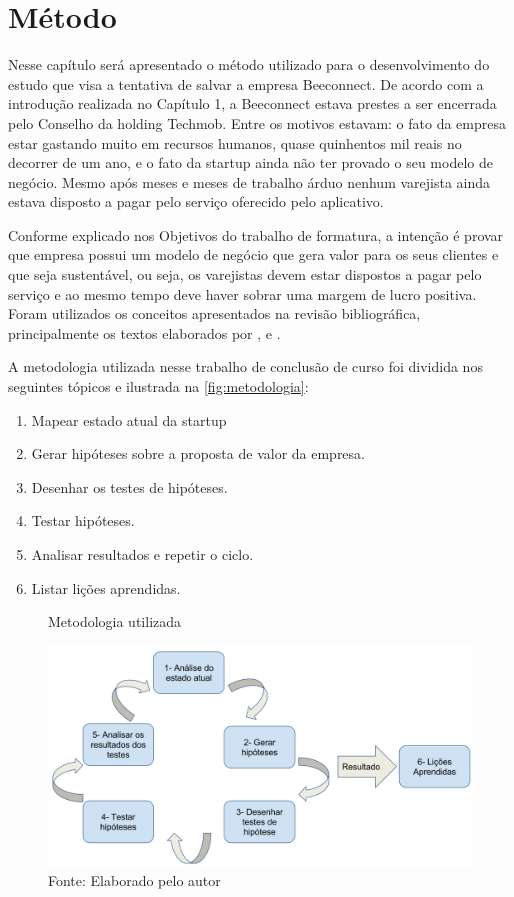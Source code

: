 \chapter[Método]{Método}
\label{chap:metodo}
Nesse capítulo será apresentado o método utilizado para o desenvolvimento do estudo que visa a tentativa de salvar a empresa Beeconnect. De acordo com a introdução realizada no Capítulo 1, a Beeconnect estava prestes a ser encerrada pelo Conselho da holding Techmob. Entre os motivos estavam: o fato da empresa estar gastando muito em recursos humanos, quase quinhentos mil reais no decorrer de um ano, e o fato da startup ainda não ter provado o seu modelo de negócio. Mesmo após meses e meses de trabalho árduo nenhum varejista ainda estava disposto a pagar pelo serviço oferecido pelo aplicativo.

Conforme explicado nos Objetivos do trabalho de formatura, a intenção é provar que empresa possui um modelo de negócio que gera valor para os seus clientes e que seja sustentável, ou seja, os varejistas devem estar dispostos a pagar pelo serviço e ao mesmo tempo deve haver sobrar uma margem de lucro positiva. Foram utilizados os conceitos apresentados na revisão bibliográfica, principalmente os textos elaborados por ,  e .

A metodologia utilizada nesse trabalho de conclusão de curso foi dividida nos seguintes tópicos e ilustrada na \autoref{fig:metodologia}:
\begin{enumerate}
\item Mapear estado atual da startup
\item Gerar hipóteses sobre a proposta de valor da empresa.
\item Desenhar os testes de hipóteses.
\item Testar hipóteses.
\item Analisar resultados e repetir o ciclo.
\item Listar lições aprendidas.
\end{enumerate}

\begin{figure}[H]
\caption{Metodologia utilizada}
\centerline{\includegraphics[scale=0.25]{img/metodologia}}
\label{fig:metodologia}
\caption* {Fonte: Elaborado pelo autor}
\end{figure}


